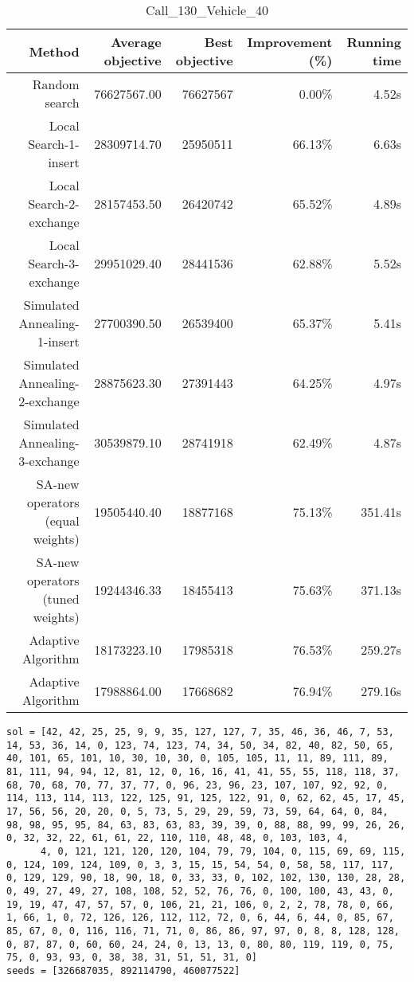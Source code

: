 \begin{table}[ht]
\centering
\caption{Call\_130\_Vehicle\_40}
\label{tab:call130vehicle40}
\begin{tabular}{|r|r|r|r|r|}
Method & Average objective & Best objective & Improvement (\%) & Running time \\
\hline
Random search & 76627567.00 & 76627567 & 0.00\% & 4.52s\\
Local Search-1-insert & 28309714.70 & 25950511 & 66.13\% & 6.63s\\
Local Search-2-exchange & 28157453.50 & 26420742 & 65.52\% & 4.89s\\
Local Search-3-exchange & 29951029.40 & 28441536 & 62.88\% & 5.52s\\
Simulated Annealing-1-insert & 27700390.50 & 26539400 & 65.37\% & 5.41s\\
Simulated Annealing-2-exchange & 28875623.30 & 27391443 & 64.25\% & 4.97s\\
Simulated Annealing-3-exchange & 30539879.10 & 28741918 & 62.49\% & 4.87s\\
SA-new operators (equal weights) & 19505440.40 & 18877168 & 75.13\% & 351.41s\\
SA-new operators (tuned weights) & 19244346.33 & 18455413 & 75.63\% & 371.13s\\
Adaptive Algorithm & 18173223.10 & 17985318 & 76.53\% & 259.27s\\
Adaptive Algorithm & 17988864.00 & 17668682 & 76.94\% & 279.16s\\
\end{tabular}%
\end{table}
\begin{lstlisting}[label={lst:call130vehicle40},caption=Optimal solution call\_130\_vehicle\_40]
sol = [42, 42, 25, 25, 9, 9, 35, 127, 127, 7, 35, 46, 36, 46, 7, 53, 14, 53, 36, 14, 0, 123, 74, 123, 74, 34, 50, 34, 82, 40, 82, 50, 65, 40, 101, 65, 101, 10, 30, 10, 30, 0, 105, 105, 11, 11, 89, 111, 89, 81, 111, 94, 94, 12, 81, 12, 0, 16, 16, 41, 41, 55, 55, 118, 118, 37, 68, 70, 68, 70, 77, 37, 77, 0, 96, 23, 96, 23, 107, 107, 92, 92, 0, 114, 113, 114, 113, 122, 125, 91, 125, 122, 91, 0, 62, 62, 45, 17, 45, 17, 56, 56, 20, 20, 0, 5, 73, 5, 29, 29, 59, 73, 59, 64, 64, 0, 84, 98, 98, 95, 95, 84, 63, 83, 63, 83, 39, 39, 0, 88, 88, 99, 99, 26, 26, 0, 32, 32, 22, 61, 61, 22, 110, 110, 48, 48, 0, 103, 103, 4,
      4, 0, 121, 121, 120, 120, 104, 79, 79, 104, 0, 115, 69, 69, 115, 0, 124, 109, 124, 109, 0, 3, 3, 15, 15, 54, 54, 0, 58, 58, 117, 117, 0, 129, 129, 90, 18, 90, 18, 0, 33, 33, 0, 102, 102, 130, 130, 28, 28, 0, 49, 27, 49, 27, 108, 108, 52, 52, 76, 76, 0, 100, 100, 43, 43, 0, 19, 19, 47, 47, 57, 57, 0, 106, 21, 21, 106, 0, 2, 2, 78, 78, 0, 66, 1, 66, 1, 0, 72, 126, 126, 112, 112, 72, 0, 6, 44, 6, 44, 0, 85, 67, 85, 67, 0, 0, 116, 116, 71, 71, 0, 86, 86, 97, 97, 0, 8, 8, 128, 128, 0, 87, 87, 0, 60, 60, 24, 24, 0, 13, 13, 0, 80, 80, 119, 119, 0, 75, 75, 0, 93, 93, 0, 38, 38, 31, 51, 51, 31, 0]
seeds = [326687035, 892114790, 460077522]
\end{lstlisting}%
\clearpage


